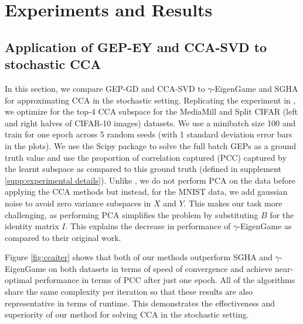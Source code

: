 \section{Experiments and Results}

\subsection{Application of GEP-EY and CCA-SVD to stochastic CCA}

In this section, we compare GEP-GD and CCA-SVD to $\gamma$-EigenGame \cite{gemp2022generalized} and SGHA \cite{chen2019constrained} for approximating CCA in the stochastic setting. Replicating the experiment in \cite{meng2021online, gemp2022generalized}, we optimize for the top-4 CCA subspace for the MediaMill and Split CIFAR (left and right halves of CIFAR-10 images) datasets. We use a minibatch size 100 and train for one epoch across 5 random seeds (with 1 standard deviation error bars in the plots). We use the Scipy \cite{virtanen2020scipy} package to solve the full batch GEPs as a ground truth value and use the proportion of correlation captured (PCC) captured by the learnt subspace as compared to this ground truth (defined in supplement \ref{supp:experimental details}). Unlike \cite{gemp2022generalized}, we do not perform PCA on the data before applying the CCA methods but instead, for the MNIST data, we add gaussian noise to avoid zero variance subspaces in $X$ and $Y$. This makes our task more challenging, as performing PCA simplifies the problem by substituting $B$ for the identity matrix $I$. This explains the decrease in performance of $\gamma$-EigenGame as compared to their original work.

Figure \ref{fig:ccaiter} shows that both of our methods outperform SGHA and $\gamma$-EigenGame on both datasets in terms of speed of convergence and achieve near-optimal performance in terms of PCC after just one epoch. All of the algorithms share the same complexity per iteration so that these results are also representative in terms of runtime. This demonstrates the effectiveness and superiority of our method for solving CCA in the stochastic setting.

